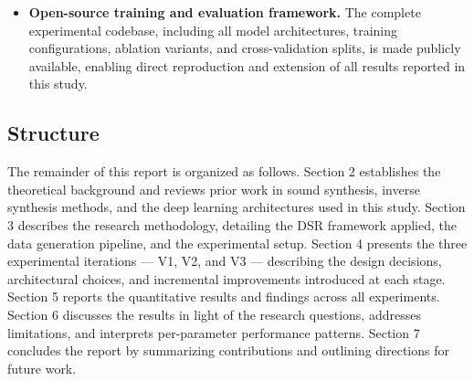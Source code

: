 \begin{itemize}
\item[$\blacksquare$] \textbf{Open-source training and evaluation framework.} The complete experimental codebase, including all model architectures, training configurations, ablation variants, and cross-validation splits, is made publicly available, enabling direct reproduction and extension of all results reported in this study.

\end{itemize}

\subsection{Structure}

The remainder of this report is organized as follows. Section 2 establishes the theoretical background and reviews prior work in sound synthesis, inverse synthesis methods, and the deep learning architectures used in this study. Section 3 describes the research methodology, detailing the DSR framework applied, the data generation pipeline, and the experimental setup. Section 4 presents the three experimental iterations — V1, V2, and V3 — describing the design decisions, architectural choices, and incremental improvements introduced at each stage. Section 5 reports the quantitative results and findings across all experiments. Section 6 discusses the results in light of the research questions, addresses limitations, and interprets per-parameter performance patterns. Section 7 concludes the report by summarizing contributions and outlining directions for future work.
